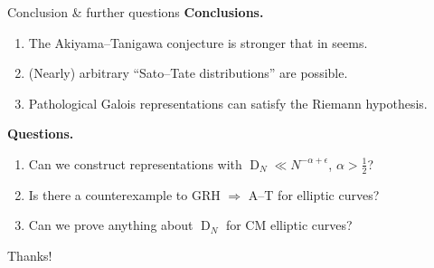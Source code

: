 \documentclass{beamer}
\DeclareMathOperator{\D}{D}
\begin{document}
\begin{frame}{Conclusion \& further questions}
\textbf{Conclusions.}
\pause
\begin{enumerate}
\item
The Akiyama--Tanigawa conjecture is stronger that in seems.
\pause

\item
(Nearly) arbitrary ``Sato--Tate distributions'' are possible.
\pause

\item
Pathological Galois representations can satisfy the Riemann hypothesis.
\end{enumerate}
\pause

\textbf{Questions.}
\pause
\begin{enumerate}
\item
Can we construct representations with $\D_N \ll N^{-\alpha+\epsilon}$, 
$\alpha > \frac 1 2$?
\pause

\item
Is there a counterexample to GRH $\Rightarrow$ A--T for elliptic curves?
\pause

\item
Can we prove anything about $\D_N$ for CM elliptic curves?
\end{enumerate}
\end{frame}



\begin{frame}
\begin{center}
\Huge Thanks!
\end{center}
\end{frame}
\end{document}

